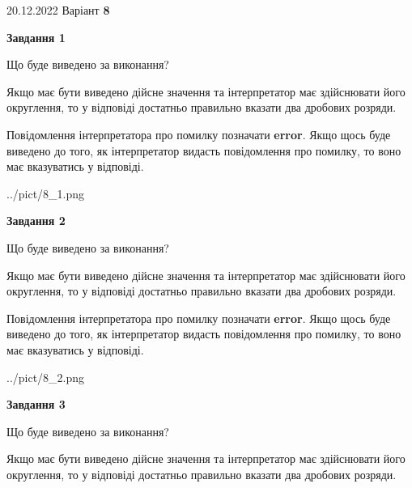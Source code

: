 \documentclass[12pt, ukrainian]{article}
\begin{document}
{20.12.2022 Варіант \No \textbf { 8 }\par}
{
\begin {Large}

{\begin {center}\textbf{Завдання 1}\end {center}}\par
Що буде виведено за виконання? \par

Якщо має бути виведено дійсне значення та інтерпретатор має здійснювати його округлення, 
то у відповіді достатньо правильно вказати два дробових розряди.

Повідомлення інтерпретатора про помилку позначати \textbf{error}.
Якщо щось буде виведено до того, як інтерпретатор видасть повідомлення про помилку, 
то воно має вказуватись у відповіді. \par

\begin{center}
	{../pict/8_1.png}
\end{center}
\newpage

{\begin {center}\textbf{Завдання 2}\end {center}}\par
Що буде виведено за виконання? \par

Якщо має бути виведено дійсне значення та інтерпретатор має здійснювати його округлення, 
то у відповіді достатньо правильно вказати два дробових розряди.

Повідомлення інтерпретатора про помилку позначати \textbf{error}.
Якщо щось буде виведено до того, як інтерпретатор видасть повідомлення про помилку, 
то воно має вказуватись у відповіді. \par

\begin{center}
	{../pict/8_2.png}
\end{center}
\newpage

{\begin {center}\textbf{Завдання 3}\end {center}}\par
Що буде виведено за виконання? \par

Якщо має бути виведено дійсне значення та інтерпретатор має здійснювати його округлення, 
то у відповіді достатньо правильно вказати два дробових розряди.


\end{Large}}
\end{document}
